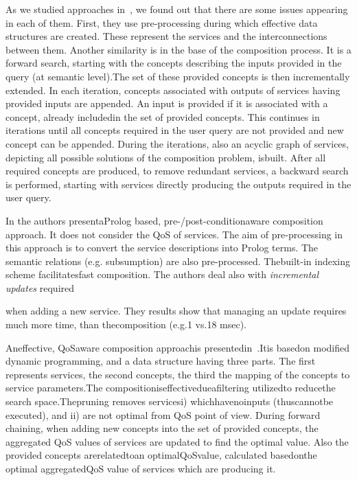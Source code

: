 \documentclass{llncs}
\begin{document}
As we studied approaches in~\cite{5, 9, 12}, we found out that there are some issues 
appearing in each of them. First, they use pre-processing during which effective 
data structures are created. These represent the services and the interconnections 
between them. Another similarity is in the base of the composition process. It is 
a forward search, starting with the concepts describing the inputs provided in the 
query (at semantic level).The set of these provided concepts is then incrementally 
extended. In each iteration, concepts associated with outputs of services having provided 
inputs are appended. An input is provided if it is associated with a concept, 
already includedin the set of provided concepts. This continues in iterations until 
all concepts required in the user query are not provided and new concept can be 
appended. During the iterations, also an acyclic graph of services, depicting all possible 
solutions of the composition problem, isbuilt. After all required concepts are 
produced, to remove redundant services, a backward search is performed, starting 
with services directly producing the outputs required in the user query. 

In \cite{12} the authors presentaProlog based, pre-/post-conditionaware composition 
approach. It does not consider the QoS of services. The aim of pre-processing in 
this approach is to convert the service descriptions into Prolog terms. The semantic 
relations (e.g. subsumption) are also pre-processed. Thebuilt-in indexing scheme 
facilitatesfast composition. The authors deal also with \textit{incremental updates} required 


when adding a new service. They results show that managing an update requires 
much more time, than thecomposition (e.g.1 vs.18 msec). 

Aneffective, QoSaware composition approachis presentedin~\cite{9}.Itis basedon 
modified dynamic programming, and a data structure having three parts. The first 
represents services, the second concepts, the third the mapping of the concepts to 
service parameters.The compositioniseffectivedueafiltering utilizedto reducethe 
search space.Thepruning removes servicesi) whichhavenoinputs (thuscannotbe 
executed), and ii) are not optimal from QoS point of view. During forward chaining, 
when adding new concepts into the set of provided concepts, the aggregated QoS 
values of services are updated to find the optimal value. Also the provided concepts 
arerelatedtoan optimalQoSvalue, calculated basedonthe optimal aggregatedQoS 
value of services which are producing it. 
\end{document}
